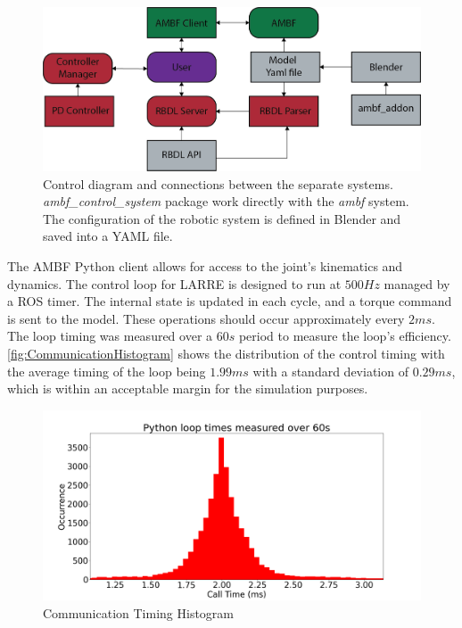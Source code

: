  \begin{figure}[h]
    \centering
    \includegraphics{images/sim/AMBF_control_diagram (1).png}
    \caption[AMBF Control Diagram]{Control diagram and connections between the separate systems. \textit{ambf\_control\_system} package work directly with the \textit{ambf} system. The configuration of the robotic system is defined in Blender and saved into a YAML file.}
    \label{fig:SystemDiagram}
\end{figure}

 
 The AMBF Python client allows for access to the joint's kinematics and dynamics. The control loop for LARRE is designed to run at $500Hz$ managed by a ROS timer. The internal state is updated in each cycle, and a torque command is sent to the model. These operations should occur approximately every $2ms$. The loop timing was measured over a $60s$ period to measure the loop's efficiency. \autoref{fig:CommunicationHistogram} shows the distribution of the control timing with the average timing of the loop being $1.99ms$ with a standard deviation of $0.29ms$, which is within an acceptable margin for the simulation purposes. 
 
  
 \begin{figure}
     \centering
     \includegraphics[scale=0.35]{images/sim/loop_timming.png}
     \caption[Communication Timing Histogram]{Communication Timing Histogram}
     \label{fig:CommunicationHistogram}
 \end{figure}
 


